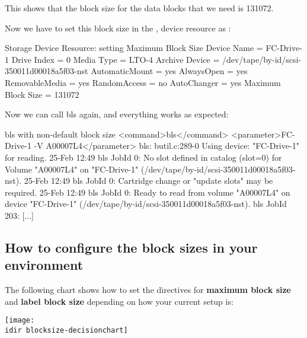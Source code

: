This shows that the block size for the data blocks that we need is 131072.

Now we have to set this block size in the , device
resource as :

\begin{bconfig}{Storage Device Resource: setting Maximum Block Size}
Device {
  Name = FC-Drive-1
  Drive Index = 0
  Media Type = LTO-4
  Archive Device = /dev/tape/by-id/scsi-350011d00018a5f03-nst
  AutomaticMount = yes
  AlwaysOpen = yes
  RemovableMedia = yes
  RandomAccess = no
  AutoChanger = yes
  Maximum Block Size = 131072
}
\end{bconfig}


Now we can call bls again, and everything works as expected:
\begin{commands}{bls with non-default block size}
<command>bls</command> <parameter>FC-Drive-1 -V A00007L4</parameter>
bls: butil.c:289-0 Using device: "FC-Drive-1" for reading.
25-Feb 12:49 bls JobId 0: No slot defined in catalog (slot=0) for Volume "A00007L4" on "FC-Drive-1" (/dev/tape/by-id/scsi-350011d00018a5f03-nst).
25-Feb 12:49 bls JobId 0: Cartridge change or "update slots" may be required.
25-Feb 12:49 bls JobId 0: Ready to read from volume "A00007L4" on device "FC-Drive-1" (/dev/tape/by-id/scsi-350011d00018a5f03-nst).
bls JobId 203: [...]
\end{commands}


\subsection*{How to configure the block sizes in your environment}
The following chart shows how to set the directives for {\bf maximum block size} and {\bf label block size}
depending on how your current setup is:

\begin{center}
\texttt{[image: \\idir blocksize-decisionchart]}
\end{center}
